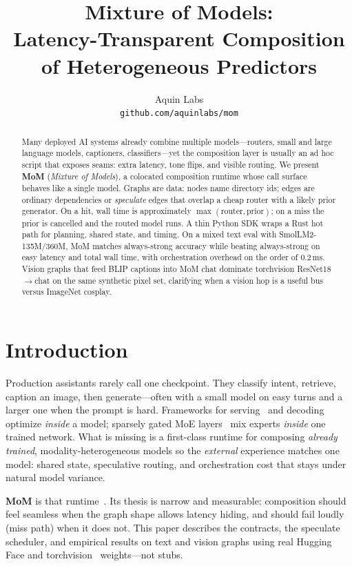 \documentclass[11pt,a4paper]{article}
\title{Mixture of Models:\\
Latency-Transparent Composition of Heterogeneous Predictors}
\author{Aquin Labs\\
\texttt{github.com/aquinlabs/mom}}
\date{}
\begin{document}
\maketitle

\begin{abstract}
Many deployed AI systems already combine multiple models---routers, small and large language models, captioners, classifiers---yet the composition layer is usually an ad hoc script that exposes seams: extra latency, tone flips, and visible routing.
We present \textbf{MoM} (\emph{Mixture of Models}), a colocated composition runtime whose call surface behaves like a single model.
Graphs are data: nodes name directory ids; edges are ordinary dependencies or \emph{speculate} edges that overlap a cheap router with a likely prior generator.
On a hit, wall time is approximately $\max(\text{router}, \text{prior})$; on a miss the prior is cancelled and the routed model runs.
A thin Python SDK wraps a Rust hot path for planning, shared state, and timing.
On a mixed text eval with SmolLM2-135M/360M, MoM matches always-strong accuracy while beating always-strong on easy latency and total wall time, with orchestration overhead on the order of $0.2\,\mathrm{ms}$.
Vision graphs that feed BLIP captions into MoM chat dominate torchvision ResNet18$\rightarrow$chat on the same synthetic pixel set, clarifying when a vision hop is a useful bus versus ImageNet cosplay.
\end{abstract}

\section{Introduction}
\label{sec:intro}

Production assistants rarely call one checkpoint.
They classify intent, retrieve, caption an image, then generate---often with a small model on easy turns and a larger one when the prompt is hard.
Frameworks for serving~\cite{kwon2023vllm} and decoding~\cite{leviathan2023speculative,chen2023accelerating} optimize \emph{inside} a model; sparsely gated MoE layers~\cite{shazeer2017moe,jiang2024mixtral} mix experts \emph{inside} one trained network.
What is missing is a first-class runtime for composing \emph{already trained}, modality-heterogeneous models so the \emph{external} experience matches one model: shared state, speculative routing, and orchestration cost that stays under natural model variance.

\textbf{MoM} is that runtime~\cite{mom2025}.
Its thesis is narrow and measurable: composition should feel seamless when the graph shape allows latency hiding, and should fail loudly (miss path) when it does not.
This paper describes the contracts, the speculate scheduler, and empirical results on text and vision graphs using real Hugging Face and torchvision~\cite{torchvision2016} weights---not stubs.
\end{document}
